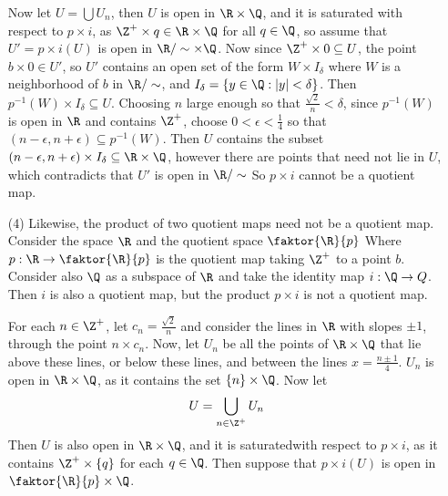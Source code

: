 \begin{example}
\begin{enumerate}
            Now let $U=\bigcup{U_n}$, then $U$ is open in  $\R \times \Q$, and
            it is saturated with
            respect to  $p \times i$, as  $\Z^+ \times q \in \R \times \Q$ for
            all  $q \in \Q$, so assume that  $U'=p \times i(U)$ is open in
            $\R/\sim \times \Q$. Now since  $\Z^+ \times 0 \subseteq U$, the
            point  $b \times 0 \in U'$, so  $U'$ contains an open set of the form
            $W \times I_{\delta}$ where $W$ is a neighborhood of  $b$ in
            $\R/\sim$, and $I_{\delta}=\{y \in \Q:|y|<\delta\}$. Then $p^{-1}(W)
            \times I_{\delta} \subseteq U$. Choosing $n$ large enough so that
            $\frac{\sqrt{2}}{n}<\delta$, since $p^{-1}(W)$ is open in $\R$ and
            contains  $\Z^+$, choose  $0<\epsilon<\frac{1}{4}$ so that
            $(n-\epsilon,n+\epsilon) \subseteq p^{-1}(W)$. Then $U$ contains the subset
            $(n-\epsilon,n+\epsilon) \times I_{\delta} \subseteq \R \times \Q$,
            however there are points that need not lie in $U$, which contradicts
            that  $U'$ is open in $\R/\sim$ So $p \times i$ cannot be a quotient
            map.

        \item[(4)] Likewise, the product of two quotient maps need not be a
            quotient map. Consider the space $\R$ and the quotient space
            $\faktor{\R}{p}$ Where $p:\R \rightarrow \faktor{\R}{p}$ is the
            quotient map taking $\Z^+$ to a point  $b$. Consider also  $\Q$ as a
            subspace of  $\R$ and take the identity map  $i:\Q \rightarrow Q$.
            Then $i$ is also a quotient map, but the product  $p \times i$ is
            not a quotient map.

            For each  $n \in \Z^+$, let  $c_n=\frac{\sqrt{2}}{n}$ and consider
            the lines in $\R$ with slopes $\pm 1$, through the point $n \times
            c_n$. Now, let $U_n$ be all the points of $\R \times \Q$ that lie
            above these lines, or below these lines, and between the lines
            $x=\frac{n \pm 1}{4}$. $U_n$ is open in  $\R \times \Q$, as it
            contains the set $\{n\} \times \Q$. Now let
            \begin{equation*}
                U=\bigcup_{n \in \Z^+}{U_n}
            \end{equation*}
            Then $U$ is also open in  $\R \times \Q$, and it is saturatedwith
            respect to  $p \times i$, as it contains  $\Z^+ \times \{q\}$ for
            each $q \in \Q$. Then suppose that  $p \times i(U)$ is open in
            $\faktor{\R}{p} \times \Q$.


\end{enumerate}
\end{example}
